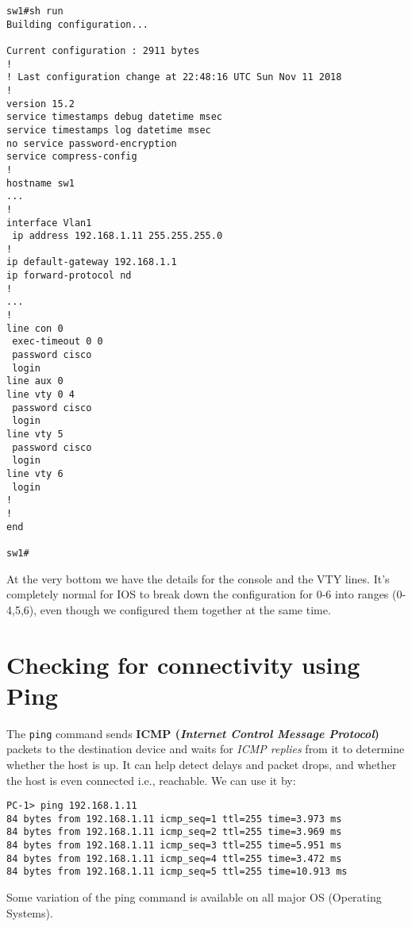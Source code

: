 \vspace{-15pt}
\begin{verbatim}
sw1#sh run
Building configuration...

Current configuration : 2911 bytes
!
! Last configuration change at 22:48:16 UTC Sun Nov 11 2018
!
version 15.2
service timestamps debug datetime msec
service timestamps log datetime msec
no service password-encryption
service compress-config
!
hostname sw1
...
!
interface Vlan1
 ip address 192.168.1.11 255.255.255.0
!
ip default-gateway 192.168.1.1
ip forward-protocol nd
!
...
!
line con 0
 exec-timeout 0 0
 password cisco
 login
line aux 0
line vty 0 4
 password cisco
 login
line vty 5
 password cisco
 login
line vty 6
 login
!
!
end

sw1#
\end{verbatim}
\vspace{-10pt}

\noindent
At the very bottom we have the details for the console and the VTY lines. It's completely normal for IOS to break down the configuration for 0-6 into ranges (0-4,5,6), even though we configured them together at the same time. 

\section{Checking for connectivity using Ping}
The \verb|ping| command sends \textbf{ICMP (\textit{Internet Control Message Protocol})} packets to the destination device and waits for \textit{ICMP replies} from it to determine whether the host is up. It can help detect delays and packet drops, and whether the host is even connected i.e., reachable. We can use it by:

\vspace{-15pt}
\begin{verbatim}
PC-1> ping 192.168.1.11
84 bytes from 192.168.1.11 icmp_seq=1 ttl=255 time=3.973 ms
84 bytes from 192.168.1.11 icmp_seq=2 ttl=255 time=3.969 ms
84 bytes from 192.168.1.11 icmp_seq=3 ttl=255 time=5.951 ms
84 bytes from 192.168.1.11 icmp_seq=4 ttl=255 time=3.472 ms
84 bytes from 192.168.1.11 icmp_seq=5 ttl=255 time=10.913 ms
\end{verbatim}
\vspace{-10pt}

\noindent
Some variation of the ping command is available on all major OS (Operating Systems). 